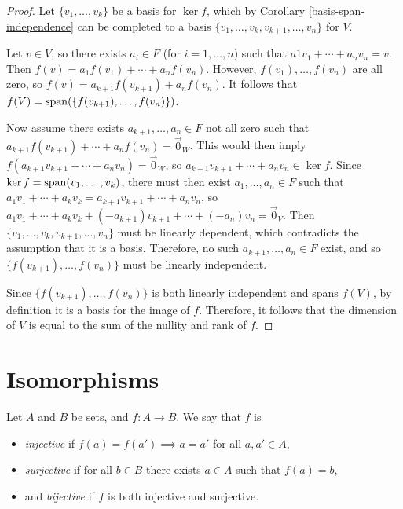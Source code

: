 \begin{proof}
    Let $\{v_1, \ldots, v_k\}$ be a basis for $\ker f$, which by Corollary \ref{basis-span-independence} can be completed to a basis $\{v_1, \ldots, v_k, v_{k+1}, \ldots, v_n\}$ for $V$.

    Let $v \in V$, so there exists $a_i \in F$ (for $i = 1, \ldots, n$) such that $a1v_1 + \cdots + a_nv_n = v$. Then $f(v) = a_1f(v_1) + \cdots + a_nf(v_n)$. However, $f(v_1), \ldots, f(v_n)$ are all zero, so $f(v) = a_{k+1}f(v_{k+1}) + a_nf(v_n)$. It follows that $f(V) = \operatorname{span}(\{f(v_{k+1}), \ldots, f(v_n)\})$.

    Now assume there exists $a_{k+1}, \ldots, a_n \in F$ not all zero such that $a_{k+1}f(v_{k+1}) + \cdots + a_nf(v_n) = \vec{0}_W$. This would then imply $f(a_{k+1}v_{k+1} + \cdots + a_nv_n) = \vec{0}_W$, so $a_{k+1}v_{k+1} + \cdots + a_nv_n \in \ker f$. Since $\ker f = \operatorname{span}(v_1, \ldots, v_k)$, there must then exist $a_1, \ldots, a_n \in F$ such that $a_1v_1 + \cdots + a_kv_k = a_{k+1}v_{k+1} + \cdots + a_nv_n$, so $a_1v_1 + \cdots + a_kv_k + (-a_{k+1})v_{k+1} + \cdots + (-a_n)v_n = \vec{0}_V$. Then $\{v_1, \ldots, v_k, v_{k+1}, \ldots, v_n\}$ must be linearly dependent, which contradicts the assumption that it is a basis. Therefore, no such $a_{k+1}, \ldots, a_n \in F$ exist, and so $\{f(v_{k+1}), \ldots, f(v_n)\}$ must be linearly independent.

    Since $\{f(v_{k+1}), \ldots, f(v_n)\}$ is both linearly independent and spans $f(V)$, by definition it is a basis for the image of $f$. Therefore, it follows that the dimension of $V$ is equal to the sum of the nullity and rank of $f$.
\end{proof}

\section{Isomorphisms}

\begin{defn}
    Let $A$ and $B$ be sets, and $f: A \to B$. We say that $f$ is \begin{itemize}
        \item \emph{injective} if $f(a) = f(a') \implies a = a'$ for all $a, a' \in A$,
        \item \emph{surjective} if for all $b \in B$ there exists $a \in A$ such that $f(a) = b$,
        \item and \emph{bijective} if $f$ is both injective and surjective.
    \end{itemize}
\end{defn}

